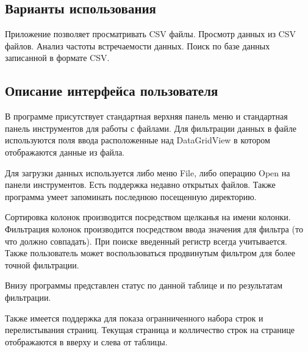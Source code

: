 \subsection{Варианты использования}

Приложение позволяет просматривать C\+S\+V файлы. Просмотр данных из C\+S\+V файлов. Анализ частоты встречаемости данных. Поиск по базе данных записанной в формате C\+S\+V.

\subsection{Описание интерфейса пользователя}

В программе присутствует стандартная верхняя панель меню и стандартная панель инструментов для работы с файлами. Для фильтрации данных в файле используются поля ввода расположенные над Data\+Grid\+View в котором отображаются данные из файла.

Для загрузки данных используется либо меню File, либо операцию Open на панели инструментов. Есть поддержка недавно открытых файлов. Также программа умеет запоминать последнюю посещенную директорию.

Сортировка колонок производится посредством щелканья на имени колонки. Фильтрация колонок производится посредством ввода значения для фильтра (то что должно совпадать). При поиске введенный регистр всегда учитывается. Также пользователь может воспользоваться продвинутым фильтром для более точной фильтрации.

Внизу программы представлен статус по данной таблице и по результатам фильтрации.

Также имеется поддержка для показа огранниченного набора строк и перелистывания страниц. Текущая страница и колличество строк на странице отображаются в вверху и слева от таблицы.

